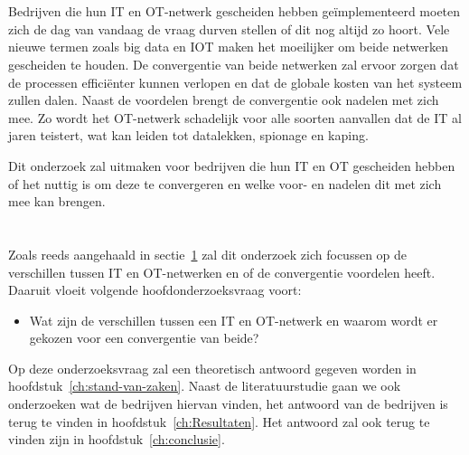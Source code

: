\section{}
\label{sec:probleemstelling}
Bedrijven die hun IT en OT-netwerk gescheiden hebben geïmplementeerd moeten zich de dag van vandaag de vraag durven stellen of dit nog altijd zo hoort. Vele nieuwe termen zoals big data en IOT maken het moeilijker om beide netwerken gescheiden te houden. De convergentie van beide netwerken zal ervoor zorgen dat de processen efficiënter kunnen verlopen en dat de globale kosten van het systeem zullen dalen. Naast de voordelen brengt de convergentie ook nadelen met zich mee. Zo wordt het OT-netwerk schadelijk voor alle soorten aanvallen dat de IT al jaren teistert, wat kan leiden tot datalekken, spionage en kaping.

Dit onderzoek zal uitmaken voor bedrijven die hun IT en OT gescheiden hebben of het nuttig is om deze te convergeren en welke voor- en nadelen dit met zich mee kan brengen.



\section{}
\label{sec:onderzoeksvraag}
\subsection{}
\label{subsec:hoofdonderzoeksvraag}
Zoals reeds aangehaald in sectie~\ref{sec:probleemstelling} zal dit onderzoek zich focussen op de verschillen tussen IT en OT-netwerken en of de convergentie voordelen heeft. Daaruit vloeit volgende hoofdonderzoeksvraag voort:
\begin{itemize}
    \item Wat zijn de verschillen tussen een IT en OT-netwerk en waarom wordt er gekozen voor een convergentie van beide?
\end{itemize}
Op deze onderzoeksvraag zal een theoretisch antwoord gegeven worden in hoofdstuk~\ref{ch:stand-van-zaken}. Naast de literatuurstudie gaan we ook onderzoeken wat de bedrijven hiervan vinden, het antwoord van de bedrijven is terug te vinden in hoofdstuk~\ref{ch:Resultaten}. Het antwoord zal ook terug te vinden zijn in hoofdstuk~\ref{ch:conclusie}.

